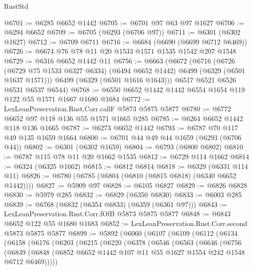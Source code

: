\begin{lexlean}{RustStd}
\begin{coremodule}
{\begin{coremodule}
{{{{{{{{{{{{{{{{{{{{{{{{{{{{{{{{{{{@6701 := @6285 @6652 @1442
@6705 := @6701 @97 @63 @97 @1627
@6706 := @6294 @6652
@6709 := @6705 (@6293 (@6706 @97))
@6711 := @6301 (@6302 @1627)
@6712 := @6709 @6711
@6716 := @6684 (@6690 (@6699 @6712 @6469))
@6726 := @6674 @76 @78 @11 @20 @1533 @1571 @1535 @1542 @207 @1548
@6729 := @6316 @6652 @1442 @11
@6756 := @6663
    (@6672
      (@6716
        (@6726 (@6729 @75 @1533 @6327 @6334) (@6494 @6652 @1442) @6499 (@6329 (@6501 @1637 @1571)))
        @6499
        (@6329 (@6501 @1616 @1643)))
      @6517
      @6521
      @6526
      @6531
      @6537
      @6544)
@6768 := @6550 @6652 @1442 @1442 @6554 @1654 @119 @122 @55 @1571 @1667 @1680 @1684
@6772 := LexLeanPreservation.Rust.Corr.callF @5873 @5875 @5877
@6780 := @6772 @6652 @97 @118 @136 @55 @1571 @1665 @285
@6785 := @6264 @6652 @1442 @118 @136 @1665
@6787 := @6273 @6652 @1442
@6793 := @6787 @70 @117 @49 @135 @1659 @1664
@6800 := @6701 @44 @49 @44 @1659 (@6293 (@6706 @44))
@6802 := @6301 (@6302 @1659)
@6804 := @6793 (@6800 @6802)
@6810 := @6787 @115 @78 @11 @20 @1662 @1535
@6812 := @6729 @114 @1662
@6814 := @6324 (@6325 @1662)
@6815 := @6812 @6814
@6818 := @6329 (@6331 @114 @11)
@6826 := @6780 (@6785 (@6804 (@6810 (@6815 @6818) (@6340 @6652 @1442))))
@6827 := @5909 @97
@6828 := @6105 @6827
@6829 := @6826 @6828
@6830 := @5979 @285
@6832 := @6829 (@6350 @6830)
@6833 := @6003 @285
@6839 := @6768 (@6832 (@6354 @6833) (@6359 (@6361 @97)))
@6843 := LexLeanPreservation.Rust.Corr.fOfB @5873 @5875 @5877
@6848 := @6843 @6652 @122 @55 @1680 @1683
@6852 := LexLeanPreservation.Rust.Corr.second @5873 @5875 @5877
@6899 := @5892
    (@6060
      (@6107
        (@6109
          (@6112
            (@6134
              (@6158
                (@6176
                  (@6203
                    (@6215
                      (@6220
                        (@6378
                          (@6546
                            (@6563
                              (@6646
                                (@6756
                                  (@6839
                                    (@6848
                                      (@6852
                                        @6652
                                        @1442
                                        @107
                                        @11
                                        @55
                                        @1627
                                        @1554
                                        @242
                                        @1548
                                        @6712
                                        @6469)))))
}}}}}}}}}}}}}}}}}}}}}}}}}}}}}}}}}}}
\end{coremodule}}
\end{coremodule}
\end{lexlean}
